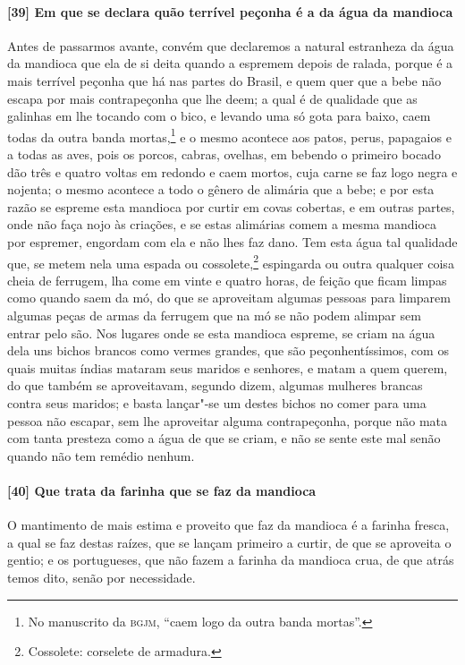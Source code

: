 \paragraph{[39] Em que se declara quão terrível peçonha é a da água da mandioca}\quad
Antes de passarmos avante, convém que declaremos a natural estranheza da água da mandioca
que ela de si deita quando a espremem depois de ralada, porque é a mais terrível peçonha
que há nas partes do Brasil, e quem quer que a bebe não escapa por mais contrapeçonha que
lhe deem; a qual é de qualidade que as galinhas em lhe tocando com o bico, e levando uma
só gota para baixo, caem todas da outra banda mortas,\footnote{ No manuscrito da
\textsc{bgjm}, ``caem logo da outra banda mortas''.} e o mesmo acontece aos patos, perus,
papagaios e a todas as aves, pois os porcos, cabras, ovelhas, em bebendo o primeiro bocado
dão três e quatro voltas em redondo e caem mortos, cuja carne se faz logo negra e nojenta;
o mesmo acontece a todo o gênero de alimária que a bebe; e por esta razão se espreme esta
mandioca por curtir em covas cobertas, e em outras partes, onde não faça nojo às criações,
e se estas alimárias comem a mesma mandioca por espremer, engordam com ela e não lhes faz
dano. Tem esta água tal qualidade que, se metem nela uma espada ou cossolete,\footnote{Cossolete: 
corselete de armadura.} espingarda
ou outra qualquer coisa cheia de ferrugem, lha come em vinte
e quatro horas, de feição que ficam limpas como quando saem da mó, do que se aproveitam
algumas pessoas para limparem algumas peças de armas da ferrugem que na mó se não podem
alimpar sem entrar pelo são. Nos lugares onde se esta mandioca espreme, se criam na água
dela uns bichos brancos como vermes grandes, que são peçonhentíssimos, com os quais muitas
índias mataram seus maridos e senhores, e matam a quem querem, do que também se
aproveitavam, segundo dizem, algumas mulheres brancas contra seus maridos; e basta
lançar"-se um destes bichos no comer para uma pessoa não escapar, sem lhe aproveitar alguma
contrapeçonha, porque não mata com tanta presteza como a água de que se criam, e não se
sente este mal senão quando não tem remédio nenhum.

\paragraph{[40] Que trata da farinha que se faz da mandioca}\quad
O mantimento de mais estima e proveito que faz da mandioca é a farinha fresca, a qual se
faz destas raízes, que se lançam primeiro a curtir, de que se aproveita o gentio; e os
portugueses, que não fazem a farinha da mandioca crua, de que atrás temos dito, senão por
necessidade.

